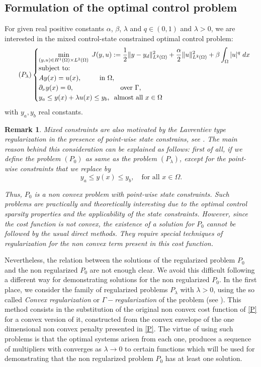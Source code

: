 \documentclass[11pt,a4paper]{amsart}
\newcommand{\om}{\Omega}
\newtheorem{remark}{{Remark}}
\newcommand{\norm}[1]{\lVert #1 \rVert}
\begin{document}
\subsection{Formulation of the optimal control problem}
For given real positive constants  $\alpha$, $\beta$, $\lambda$ and $q\in (0,1)$ and $\lambda>0$, we are interested in the mixed control-state constrained optimal control problem:
\begin{equation}\label{plambda}\tag{$P_{\lambda}$}
    \begin{cases}
    \displaystyle\min_{(y,u)\in H^1(\om)\times L^2(\om)}\; J(y,u) := \frac{1}{2}\norm{y-y_d}^2_{L^2(\om)}+\frac{\alpha}{2}\norm{u}^2_{L^2(\om)}+\beta \int_{\om} |u|^{q}\; dx\\
    \mbox{subject to:}\\
    Ay(x)=u(x), \phantom{aaaaa} \mbox{in } \om,\\
    \partial_{\nu}y(x)=0, \phantom{aaaaaaaaaaaaa} \mbox{over } \Gamma,\\    
    y_a\le y(x)+\lambda u(x)\le y_b,\phantom{a} \mbox{almost all }x\in \Omega
    \end{cases}
\end{equation}
with $y_a, y_b$ real constants. 

\begin{remark}
    Mixed constraints are also motivated by the Lavrentiev type regularization in the presence of point-wise state constrains, see \cite{meyer1}. 
    The main reason behind this consideration can be explained as follows: first of all, if we define the problem $(P_0)$ as same as the problem $(P_{\lambda})$, except for the point-wise constraints that we replace by $$y_a\le y(x)\le y_b,\quad \text{for all } x\in \Omega.$$
    
     Thus, $P_{0}$ is a non convex problem with point-wise state constraints. Such problems are practically and theoretically interesting due to the optimal control sparsity properties and the applicability of the state constraints. However, since the cost function is not convex, the existence of a solution for $P_0$ cannot be followed by the usual direct methods. They require special techniques of regularization for the non convex term present in this cost function. 
\end{remark}
 
Nevertheless, the relation between the solutions of the regularized problem $P_0$ and the non regularized $P_0$ are not enough clear. We avoid this difficult following a different way for demonstrating solutions for the non regularized $P_0$. In the first place, we consider the family of regularized problems $P_{\lambda}$ with $\lambda>0$, using the so called  \textit{Convex regularization} or $\Gamma-$\textit{regularization} of the problem (see \cite{eck}). This method consists in the substitution of the original non convex cost function of \eqref{P} for a convex version of it, constructed from the convex envelope of the one dimensional non convex penalty presented in \eqref{P}. The virtue of using such problems is that the optimal systems arisen from each one, produces a sequence of multipliers with converges as $\lambda\to 0$ to certain functions which will be used for demonstrating that the non regularized problem $P_0$ has at least one solution.
\end{document}

